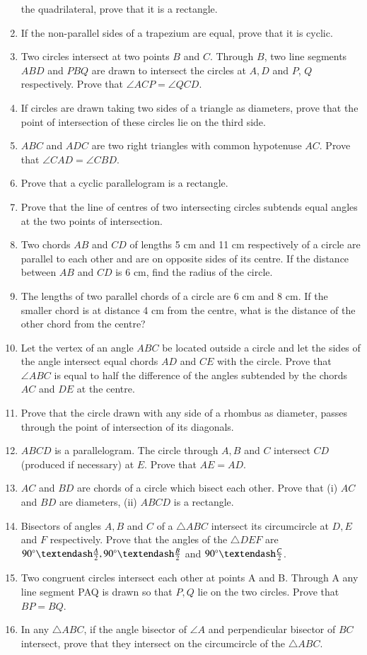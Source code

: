\begin{enumerate}[label=\arabic*.,ref=\thesubsection.\theenumi]
the quadrilateral, prove that it is a rectangle.
\item If the non-parallel sides of a trapezium are equal, prove that it is cyclic.
\item Two circles intersect at two points $B$ and $C$.
Through $B$, two line segments $ABD$ and $PBQ$
are drawn to intersect the circles at $A, D$ and $P$,
$Q$ respectively. Prove that
$\angle ACP = \angle QCD$.
\item If circles are drawn taking two sides of a triangle as diameters, prove that the point of
intersection of these circles lie on the third side.
\item $ABC$ and $ADC$ are two right triangles with common hypotenuse $AC$. Prove that
$\angle CAD = \angle CBD$.
\item Prove that a cyclic parallelogram is a rectangle.
\item Prove that the line of centres of two intersecting circles subtends equal angles at the
two points of intersection.
\item Two chords $AB$ and $CD$ of lengths 5 cm and 11 cm respectively of a circle are parallel
to each other and are on opposite sides of its centre. If the distance between $AB$ and
$CD$ is 6 cm, find the radius of the circle.
\item The lengths of two parallel chords of a circle are 6 cm and 8 cm. If the smaller chord is
at distance 4 cm from the centre, what is the distance of the other chord from the
centre?
\item Let the vertex of an angle $ABC$ be located outside a circle and let the sides of the angle
intersect equal chords $AD$ and $CE$ with the circle. Prove that $\angle ABC$ is equal to half the
difference of the angles subtended by the chords $AC$ and $DE$ at the centre.
\item Prove that the circle drawn with any side of a rhombus as diameter, passes through
the point of intersection of its diagonals.
\item $ABCD$ is a parallelogram. The circle through $A, B$ and $C$ intersect $CD$ (produced if
necessary) at $E$. Prove that $AE = AD$.
\item $AC$ and $BD$ are chords of a circle which bisect each other. Prove that (i) $AC$ and $BD$ are
diameters, (ii) $ABCD$ is a rectangle.
\item Bisectors of angles $A, B$ and $C$ of a $\triangle ABC$ intersect its circumcircle at $D, E$ and
$F$ respectively. Prove that the angles of the $\triangle DEF$ are $90\degree – \frac{A}{2}, 90\degree – \frac{B}{2}$ and $90\degree – \frac{C}{2}$.
\item Two congruent circles intersect each other at points A and B. Through A any line segment PAQ is drawn so that $P, Q$ lie on the two circles. Prove that $BP = BQ$.
\item In any $\triangle ABC$, if the angle bisector of $\angle A$ and perpendicular bisector of $BC$ intersect, prove that they intersect on the circumcircle of the $\triangle ABC$.
\end{enumerate}
